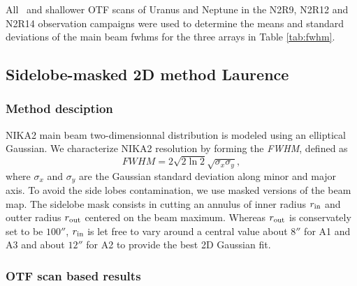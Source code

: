 All \bm\ and shallower OTF scans of Uranus and Neptune in the N2R9,
N2R12 and N2R14 observation campaigns were used to determine the means
and standard deviations of the main beam fwhms for the three arrays in
Table \ref{tab:fwhm}.



\subsection{Sidelobe-masked 2D method {\color{YellowGreen} Laurence}}
\label{se:beam_mb_2D}

\subsubsection{Method desciption}
\label{se:2D_method}

NIKA2 main beam two-dimensionnal distribution is modeled using an
elliptical Gaussian. We characterize NIKA2 resolution by forming the
\emph{FWHM}, defined as
\begin{equation}
  FWHM = 2 \sqrt{2\ln {2}} \sqrt{\sigma_x\sigma_y},
\end{equation}
where $\sigma_x$ and $\sigma_y$ are the Gaussian standard deviation
along minor and major axis.
To avoid the side lobes contamination, we use masked versions of the
beam map. The sidelobe mask consists in cutting an annulus of inner radius
$r_{\rm{in}}$ and outter radius $r_{\rm{out}}$ centered on the beam
maximum. Whereas $r_{\rm{out}}$ is conservately set to be $100''$,
$r_{\rm{in}}$ is let free to vary around a central value about $8''$
for A1 and A3 and about $12''$ for A2 to provide the best 2D Gaussian
fit.

\subsubsection{OTF scan based results}
\label{se:mb_with_otf}

